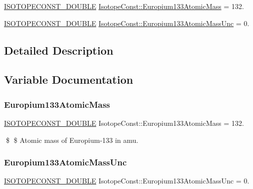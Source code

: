 \begin{DoxyCompactItemize}
\item 
\mbox{\hyperlink{group___isotope_const-_macros_ga8f45a7272ce02c0b4c65c44636ed719a}{I\+S\+O\+T\+O\+P\+E\+C\+O\+N\+S\+T\+\_\+\+D\+O\+U\+B\+LE}} \mbox{\hyperlink{group___isotope_const-_europium-_eu133_gab678352e36c55397624061d69f39803d}{Isotope\+Const\+::\+Europium133\+Atomic\+Mass}} = 132.
\item 
\mbox{\hyperlink{group___isotope_const-_macros_ga8f45a7272ce02c0b4c65c44636ed719a}{I\+S\+O\+T\+O\+P\+E\+C\+O\+N\+S\+T\+\_\+\+D\+O\+U\+B\+LE}} \mbox{\hyperlink{group___isotope_const-_europium-_eu133_ga6adee18b16a4a430a5b499d45c5ebf7d}{Isotope\+Const\+::\+Europium133\+Atomic\+Mass\+Unc}} = 0.
\end{DoxyCompactItemize}


\subsection{Detailed Description}


\subsection{Variable Documentation}
\mbox{\label{group___isotope_const-_europium-_eu133_gab678352e36c55397624061d69f39803d}} 
\subsubsection{\texorpdfstring{Europium133\+Atomic\+Mass}{Europium133AtomicMass}}
{\footnotesize\ttfamily \mbox{\hyperlink{group___isotope_const-_macros_ga8f45a7272ce02c0b4c65c44636ed719a}{I\+S\+O\+T\+O\+P\+E\+C\+O\+N\+S\+T\+\_\+\+D\+O\+U\+B\+LE}} Isotope\+Const\+::\+Europium133\+Atomic\+Mass = 132.}

\$ \$ Atomic mass of Europium-\/133 in amu. \mbox{\label{group___isotope_const-_europium-_eu133_ga6adee18b16a4a430a5b499d45c5ebf7d}} 
\subsubsection{\texorpdfstring{Europium133\+Atomic\+Mass\+Unc}{Europium133AtomicMassUnc}}
{\footnotesize\ttfamily \mbox{\hyperlink{group___isotope_const-_macros_ga8f45a7272ce02c0b4c65c44636ed719a}{I\+S\+O\+T\+O\+P\+E\+C\+O\+N\+S\+T\+\_\+\+D\+O\+U\+B\+LE}} Isotope\+Const\+::\+Europium133\+Atomic\+Mass\+Unc = 0.}

